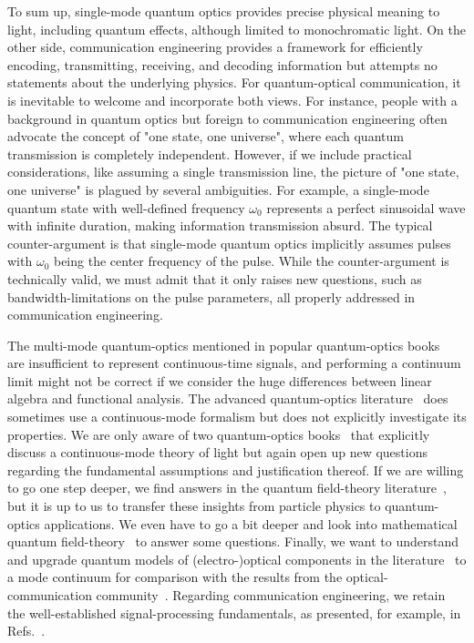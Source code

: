 To sum up, single-mode quantum optics provides precise physical meaning to light, including quantum effects, although limited to monochromatic light.
On the other side, communication engineering provides a framework for efficiently encoding, transmitting, receiving, and decoding information but attempts no statements about the underlying physics.
For quantum-optical communication, it is inevitable to welcome and incorporate both views.
For instance, people with a background in quantum optics but foreign to communication engineering often advocate the concept of "one state, one universe", where each quantum transmission is completely independent.
However, if we include practical considerations, like assuming a single transmission line, the picture of "one state, one universe" is plagued by several ambiguities.
For example, a single-mode quantum state with well-defined frequency $\omega_0$ represents a perfect sinusoidal wave with infinite duration, making information transmission absurd.
The typical counter-argument is that single-mode quantum optics implicitly assumes pulses with $\omega_0$ being the center frequency of the pulse.
While the counter-argument is technically valid, we must admit that it only raises new questions, such as bandwidth-limitations on the pulse parameters, all properly addressed in communication engineering.

The multi-mode quantum-optics mentioned in popular quantum-optics books~\cite{Gerry2005,Fox2006} are insufficient to represent continuous-time signals, and performing a continuum limit might not be correct if we consider the huge differences between linear algebra and functional analysis.
The advanced quantum-optics literature~\cite{Vogel2006,Mandel1995} does sometimes use a continuous-mode formalism but does not explicitly investigate its properties.
We are only aware of two quantum-optics books~\cite{Loudon2000,Barnett2002} that explicitly discuss a continuous-mode theory of light but again open up new questions regarding the fundamental assumptions and justification thereof.
If we are willing to go one step deeper, we find answers in the quantum field-theory literature~\cite{Peskin1995,Srednicki2007,Greiner2013,Itzykson2012}, but it is up to us to transfer these insights from particle physics to quantum-optics applications.
We even have to go a bit deeper and look into mathematical quantum field-theory~\cite{Streater2016,Bogoliubov1982,Bogolubov1989} to answer some questions.
Finally, we want to understand and upgrade quantum models of (electro-)optical components in the literature~\cite{Vogel2006,Leonhardt2003,Haroche2006,Mandel1995} to a mode continuum for comparison with the results from the optical-communication community~\cite{Shapiro2009,Kikuchi2016}.
Regarding communication engineering, we retain the well-established signal-processing fundamentals, as presented, for example, in Refs.~\cite{Rauscher2011,Nossek2015,Lyons2004,Madhow2008,Proakis2007,Gallager2008}.

